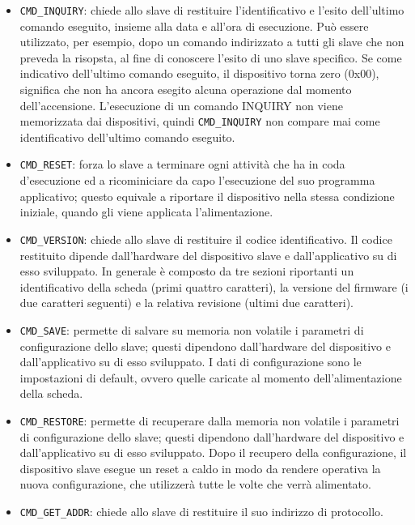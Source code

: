 \begin{itemize}
\item \texttt{CMD\_INQUIRY}: chiede allo slave di restituire l'identificativo e 
l'esito dell'ultimo comando eseguito,
insieme alla data e all'ora di esecuzione. Pu\`o essere utilizzato, per esempio, dopo un comando indirizzato a tutti gli 
slave che non preveda la risopsta, al fine di conoscere l'esito di uno slave specifico. Se come indicativo dell'ultimo
comando eseguito, il dispositivo torna zero (0x00), significa che non ha ancora esegito alcuna operazione dal momento
dell'accensione. L'esecuzione di un comando INQUIRY non viene memorizzata dai dispositivi, quindi \texttt{CMD\_INQUIRY} non
compare mai come identificativo dell'ultimo comando eseguito.
\item \texttt{CMD\_RESET}: forza lo slave a terminare ogni attivit\`a che ha in coda d'esecuzione ed a ricominiciare da
capo l'esecuzione del suo programma applicativo; questo equivale a riportare il dispositivo nella stessa condizione iniziale,
quando gli viene applicata l'alimentazione.
\item \texttt{CMD\_VERSION}: chiede allo slave di restituire il codice identificativo. Il codice restituito dipende dall'hardware
del dispositivo slave e dall'applicativo su di esso sviluppato. In generale \`e composto da tre sezioni riportanti un
identificativo della scheda (primi quattro caratteri), la versione del firmware (i due caratteri seguenti) e la relativa revisione
(ultimi due caratteri).
\item \texttt{CMD\_SAVE}: permette di salvare su memoria non volatile i parametri di configurazione dello slave;
questi dipendono dall'hardware del dispositivo e dall'applicativo su di esso sviluppato. I dati di configurazione sono le
impostazioni di default, ovvero quelle caricate al momento dell'alimentazione della scheda.
\item \texttt{CMD\_RESTORE}: permette di recuperare dalla memoria non volatile i parametri di configurazione dello slave;
questi dipendono dall'hardware del dispositivo e dall'applicativo su di esso sviluppato. Dopo il recupero della configurazione,
il dispositivo slave esegue un reset a caldo in modo da rendere operativa la nuova configurazione, che utilizzer\`a tutte le volte
che verr\`a alimentato.
\item \texttt{CMD\_GET\_ADDR}: chiede allo slave di restituire il suo indirizzo di protocollo.

\end{itemize}
